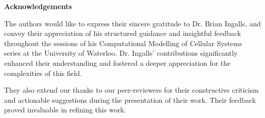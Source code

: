 \pagestyle{plain}
\setcounter{page}{2}

\cleardoublepage %

\begin{center}\textbf{Acknowledgements}\end{center}
The authors would like to express their sincere gratitude to Dr. Brian Ingalls, and convey their appreciation of his structured guidance and insightful feedback throughout the sessions of his Computational Modelling of Cellular Systems series at the University of Waterloo. Dr. Ingalls' contributions significantly enhanced their understanding and fostered a deeper appreciation for the complexities of this field.

They also extend our thanks to our peer-reviewers for their constructive criticism and actionable suggestions during the presentation of their work. Their feedback proved invaluable in refining this work.

\cleardoublepage
{}    %

\renewcommand\contentsname{Table of Contents}
\tableofcontents
\cleardoublepage
{}    %

\listoffigures
\cleardoublepage
{}		%

\listoftables
\cleardoublepage
{}		%

\renewcommand*{\abbreviationsname}{List of Abbreviations}
\printglossary[type=abbreviations]
\cleardoublepage
{}		%




